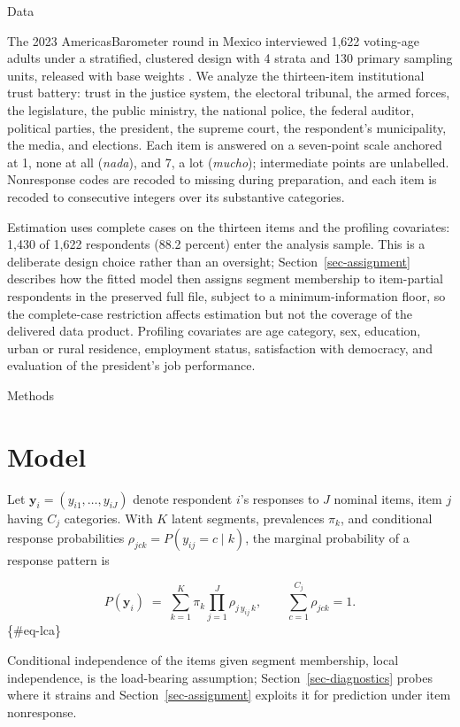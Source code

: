 \documentclass[
  12pt]{article}
\begin{document}
Data

The 2023 AmericasBarometer round in Mexico interviewed 1,622 voting-age
adults under a stratified, clustered design with 4 strata and 130
primary sampling units, released with base weights \citep{lapop2023}. We
analyze the thirteen-item institutional trust battery: trust in the
justice system, the electoral tribunal, the armed forces, the
legislature, the public ministry, the national police, the federal
auditor, political parties, the president, the supreme court, the
respondent's municipality, the media, and elections. Each item is
answered on a seven-point scale anchored at 1, none at all
(\emph{nada}), and 7, a lot (\emph{mucho}); intermediate points are
unlabelled. Nonresponse codes are recoded to missing during preparation,
and each item is recoded to consecutive integers over its substantive
categories.

Estimation uses complete cases on the thirteen items and the profiling
covariates: 1,430 of 1,622 respondents (88.2 percent) enter the analysis
sample. This is a deliberate design choice rather than an oversight;
Section~\ref{sec-assignment} describes how the fitted model then assigns
segment membership to item-partial respondents in the preserved full
file, subject to a minimum-information floor, so the complete-case
restriction affects estimation but not the coverage of the delivered
data product. Profiling covariates are age category, sex, education,
urban or rural residence, employment status, satisfaction with
democracy, and evaluation of the president's job performance.

Methods

\section{Model}\label{sec-model}

Let \(\mathbf{y}_i = (y_{i1}, \dots, y_{iJ})\) denote respondent \(i\)'s
responses to \(J\) nominal items, item \(j\) having \(C_j\) categories.
With \(K\) latent segments, prevalences \(\pi_k\), and conditional
response probabilities \(\rho_{jck} = P(y_{ij} = c \mid k)\), the
marginal probability of a response pattern is

\[P(\mathbf{y}_i) \;=\; \sum_{k=1}^{K} \pi_k \prod_{j=1}^{J} \rho_{j\,y_{ij}\,k},
\qquad \sum_{c=1}^{C_j} \rho_{jck} = 1 .\] \{\#eq-lca\}

Conditional independence of the items given segment membership, local
independence, is the load-bearing assumption;
Section~\ref{sec-diagnostics} probes where it strains and
Section~\ref{sec-assignment} exploits it for prediction under item
nonresponse.
\end{document}

